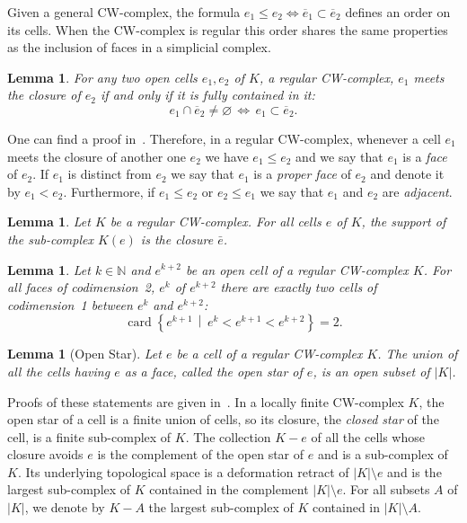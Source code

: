\documentclass[10pt]{amsart}
\providecommand{\Bar}{\overline}
\newtheorem{lemm}[theo]{Lemma}
\theoremstyle{definition}
\numberwithin{equation}{section}
\numberwithin{figure}{section}
\newcommand{\N}{\mathbb{N}}
\DeclareMathOperator{\card}{card}
\begin{document}

Given a general CW-complex, the formula $e_1\leq e_2\iff \Bar{e}_1\subset\Bar{e}_2$ defines an order on its cells. When the CW-complex is regular this order shares the same properties as the inclusion of faces in a simplicial complex.

\begin{lemm}
For any two open cells $e_1,e_2$ of $K$, a regular CW-complex, $e_1$ meets the closure of $e_2$ if and only if it is fully contained in it:
\begin{equation*}
e_1\cap\Bar{e}_2\neq \varnothing \, \iff\, e_1\subset \Bar{e}_2.
\end{equation*}
\end{lemm}

One can find a proof in~\cite[pp.~229-230, R.R.1]{Coo-Fin_hom_cel}.
Therefore, in a regular CW-complex, whenever a cell $e_1$ meets the closure of another one $e_2$ we have $e_1\leq e_2$ and we say that $e_1$ is a \emph{face} of $e_2$. If $e_1$ is distinct from $e_2$ we say that $e_1$ is a \emph{proper face} of $e_2$ and denote it by $e_1<e_2$. Furthermore, if $e_1\leq e_2$ or $e_2\leq e_1$ we say that $e_1$ and $e_2$ are \emph{adjacent}.

\begin{lemm}
Let $K$ be a regular CW-complex. For all cells $e$ of $K$, the support of the sub-complex $K(e)$ is the closure $\bar{e}$.
\end{lemm}

\begin{lemm}\label{lemm:2_faces}
Let $k\in\N$ and $e^{k+2}$ be an open cell of a regular CW-complex $K$. For all faces of codimension~2, $e^k$ of $e^{k+2}$ there are exactly two cells of codimension~1 between $e^k$ and $e^{k+2}$:
\begin{equation*}
\card \left\{e^{k+1}\,\middle|\,e^k<e^{k+1}<e^{k+2}\right\}=2.
\end{equation*}
\end{lemm}

\begin{lemm}[Open Star]
Let $e$ be a cell of a regular CW-complex $K$. The union of all the cells having $e$ as a face, called the \emph{open star} of $e$, is an open subset of $|K|$.
\end{lemm}

Proofs of these statements are given in~\cite[Proposition~1.6, p.~30, Theorem~4.2, pp.~231-232, Lemma~4.1, p.~230]{Coo-Fin_hom_cel}.
In a locally finite CW-complex $K$, the open star of a cell is a finite union of cells, so its closure, the \emph{closed star} of the cell, is a finite sub-complex of $K$. The collection $K-e$ of all the cells whose closure avoids $e$ is the complement of the open star of $e$ and is a sub-complex of $K$. Its underlying topological space is a deformation retract of $|K|\setminus e$ and is the largest sub-complex of $K$ contained in the complement $|K|\setminus e$. For all subsets $A$ of $|K|$, we denote by $K-A$ the largest sub-complex of $K$ contained in $|K|\setminus A$.
\end{document}
